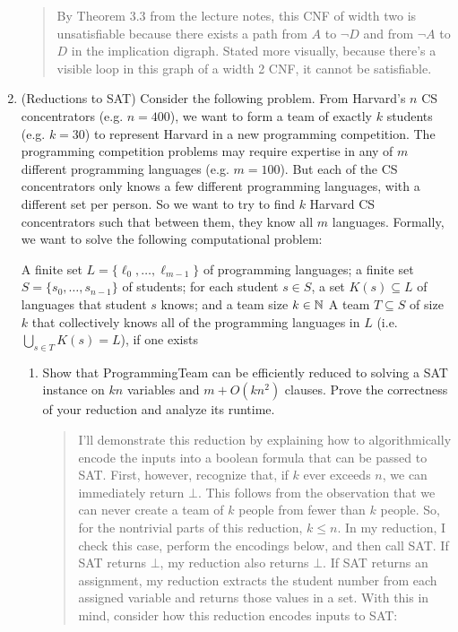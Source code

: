 \documentclass[11pt]{article}
\begin{document}
\begin{enumerate}
\begin{quote}
    By Theorem $3.3$ from the lecture notes, this CNF of width two is unsatisfiable because there exists a path from $A$ to $\neg D$ and from $\neg A$ to $D$ in the implication digraph. Stated more visually, because there's a visible loop in this graph of a width 2 CNF, it cannot be satisfiable. 
\end{quote}

\item (Reductions to SAT)  Consider the following problem.  From Harvard's $n$ CS concentrators (e.g. $n=400$), we want to form a team of exactly $k$ students (e.g. $k=30$) to represent Harvard in a new programming competition.  The programming competition problems may require expertise in any of $m$ different programming languages (e.g. $m=100$).  But each of the CS concentrators only knows a few different programming languages, with a different set per person. So we want to try to find $k$ Harvard CS concentrators such that between them, they know all $m$ languages. Formally, we want to solve the following computational problem:

{A finite set $L=\{\ell_0,\ldots,\ell_{m-1}\}$ of programming languages; a finite set 
$S=\{s_0,\ldots,s_{n-1}\}$ of students; for each student $s\in S$, a set $K(s)\subseteq L$ of languages that student $s$ knows; and a team size $k\in \mathbb{N}$}
{A team $T\subseteq S$ of size $k$ that collectively knows all of the programming languages in $L$ (i.e. $\bigcup_{s\in T} K(s)=L$), if one exists}

\begin{enumerate}
    \item 
Show that ProgrammingTeam can be efficiently reduced to solving a SAT instance on $kn$ variables and $m+O(kn^2)$ clauses.  Prove the correctness of your reduction and analyze its runtime.

\begin{quote}
    \color{purple}
    I'll demonstrate this reduction by explaining how to algorithmically encode the inputs into a boolean formula that can be passed to SAT. First, however, recognize that, if $k$ ever exceeds $n$, we can immediately return $\bot$. This follows from the observation that we can never create a team of $k$ people from fewer than $k$ people. So, for the nontrivial parts of this reduction, $k \leq n$. In my reduction, I check this case, perform the encodings below, and then call SAT. If SAT returns $\bot$, my reduction also returns $\bot$. If SAT returns an assignment, my reduction extracts the student number from each assigned variable and returns those values in a set. With this in mind, consider how this reduction encodes inputs to SAT: \\
    

\end{quote}
\end{enumerate}
\end{enumerate}
\end{document}
